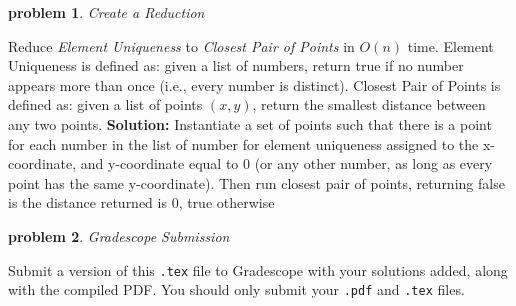 \documentclass[10pt]{article}
\newcommand{\solution}[1]{\color{blue}\hfill\break\noindent\textbf{Solution:} #1\color{black}}
\newtheorem{problem}{\sc\color{cit}problem}
\begin{document}
\begin{problem}Create a Reduction\end{problem}
Reduce \textit{Element Uniqueness} to \textit{Closest Pair of Points} in $O(n)$ time.  Element Uniqueness is defined as: given a list of numbers, return true if no number appears more than once (i.e., every number is distinct).  Closest Pair of Points is defined as: given a list of points $(x,y)$, return the smallest distance between any two points.
\solution{
Instantiate a set of points such that there is a point for each number in the list of number for element uniqueness assigned to the x-coordinate, and y-coordinate equal to 0 (or any other number, as long as every point has the same y-coordinate). Then run closest pair of points, returning false is the distance returned is 0, true otherwise
}

\begin{problem} Gradescope Submission \end{problem}
Submit a version of this \verb|.tex| file to Gradescope with your solutions added, along with the compiled PDF.  You should only submit your \verb|.pdf| and \verb|.tex| files.
\end{document}
